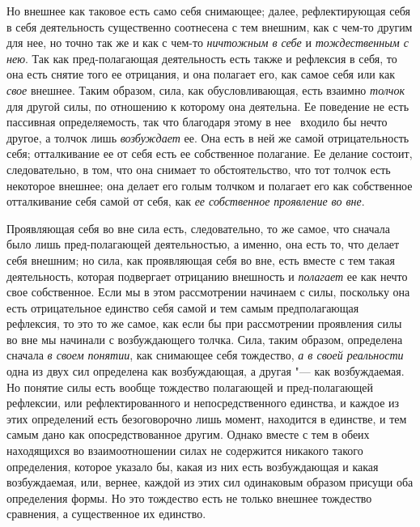 Но внешнее как таковое есть само себя снимающее; далее, рефлектирующая себя
в себя деятельность существенно соотнесена с тем внешним, как с чем-то
другим для нее, но точно так же и как с чем-то
{\em ничтожным в себе} и
{\em тождественным с нею}. Так как пред-полагающая
деятельность есть также и рефлексия в себя, то она есть снятие того ее
отрицания, и она полагает его, как самое себя или как
{\em свое} внешнее. Таким образом, сила, как
обусловливающая, есть взаимно {\em толчок} для другой
силы, по отношению к которому она деятельна. Ее поведение не есть пассивная
определяемость, так что благодаря этому в нее \ входило бы нечто другое, а
толчок лишь {\em возбуждает} ее. Она есть в ней же
самой отрицательность себя; отталкивание ее от себя есть ее собственное
полагание. Ее делание состоит, следовательно, в том, что она снимает то
обстоятельство, что тот толчок есть некоторое внешнее; она делает его голым
толчком и полагает его как собственное отталкивание себя самой от себя, как
{\em ее собственное проявление во вне}.

Проявляющая себя во вне сила есть, следовательно, то же самое, что сначала
было лишь пред-полагающей деятельностью, а именно, она есть то, что делает
себя внешним; но сила, как проявляющая себя во вне, есть вместе с тем такая
деятельность, которая подвергает отрицанию внешность и
{\em полагает} ее как нечто свое собственное. Если мы в
этом рассмотрении начинаем с силы, поскольку она есть отрицательное
единство себя самой и тем самым предполагающая рефлексия, то это то же
самое, как если бы при рассмотрении проявления силы во вне мы начинали с
возбуждающего толчка. Сила, таким образом, определена сначала
{\em в своем понятии}, как снимающее себя тождество,
{\em а в своей реальности} одна из двух сил определена
как возбуждающая, а другая "--- как возбуждаемая. Но понятие силы есть вообще
тождество полагающей и пред-полагающей рефлексии, или рефлектированного и
непосредственного единства, и каждое из этих определений есть безоговорочно
лишь момент, находится в единстве, и тем самым дано как опосредствованное
другим. Однако вместе с тем в обеих находящихся во взаимоотношении силах не
содержится никакого такого определения, которое указало бы, какая из них
есть возбуждающая и какая возбуждаемая, или, вернее, каждой из этих сил
одинаковым образом присущи оба определения формы. Но это тождество есть не
только внешнее тождество сравнения, а существенное их единство.

